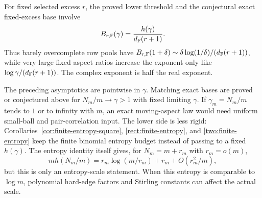 \begin{remark}\label{rem:moving-aspect}
For fixed selected excess \(r\), the proved lower threshold and the conjectural
exact fixed-excess base involve
\[
  B_{r,\mathbb{F}}(\gamma)=\frac{h(\gamma)}{d_{\mathbb{F}}(r+1)}.
\]
Thus barely overcomplete row pools have \(B_{r,\mathbb{F}}(1+\delta)\sim
\delta\log(1/\delta)/(d_{\mathbb{F}}(r+1))\), while very large fixed aspect ratios increase
the exponent only like \(\log\gamma/(d_{\mathbb{F}}(r+1))\).  The complex exponent is half
the real exponent.

The preceding asymptotics are pointwise in \(\gamma\).  Matching exact bases are
proved or conjectured above for \(N_m/m\to\gamma>1\) with fixed limiting
\(\gamma\).  If \(\gamma_m=N_m/m\) tends to \(1\) or to infinity with \(m\), an
exact moving-aspect law would need uniform small-ball and pair-correlation input.
The lower side is less rigid: Corollaries~\ref{cor:finite-entropy-square},
\ref{rect:finite-entropy}, and \ref{two:finite-entropy} keep the finite binomial
entropy budget instead of passing to a fixed \(h(\gamma)\).
The entropy identity itself gives, for \(N_m=m+r_m\) with \(r_m=o(m)\),
\[
  m h(N_m/m)=r_m\log(m/r_m)+r_m+O(r_m^2/m),
\]
but this is only an entropy-scale statement.  When this entropy is comparable
to \(\log m\), polynomial hard-edge factors and Stirling constants can affect
the actual scale.
\end{remark}
